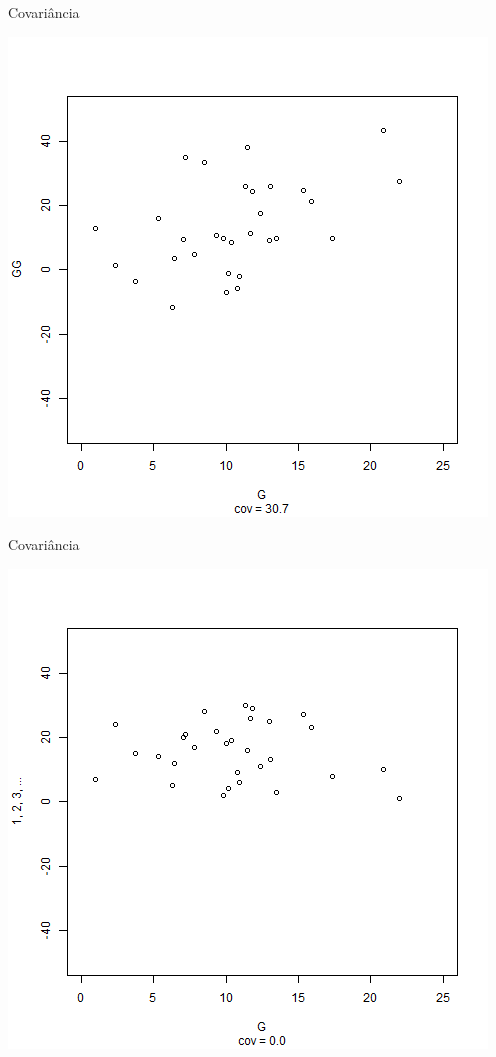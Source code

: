 \documentclass{beamer}
\begin{document}
\begin{frame}{Covariância}
  \begin{center}
    \includegraphics[height=.8\textheight]{Cap17/anim-3}
  \end{center}
\end{frame}

\begin{frame}{Covariância}
  \begin{center}
    \includegraphics[height=.8\textheight]{Cap17/anim-n}
  \end{center}
\end{frame}
\end{document}
